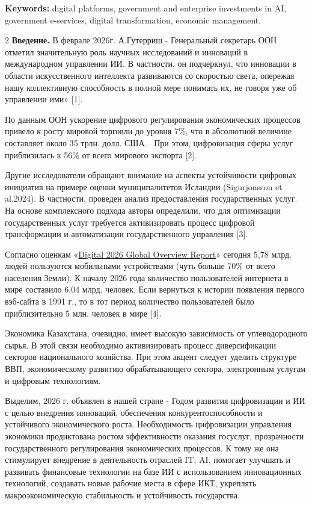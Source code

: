 {\bfseries Keywords:} digital platforms, government and enterprise
investments in AI, government e-services, digital transformation,
economic management.

\begin{multicols}{2}
{\bfseries Введение.} В феврале 2026г. А.Гутерриш - Генеральный секретарь
ООН отметил значительную роль научных исследований и инноваций в
международном управлении ИИ\emph{.} В частности, он подчеркнул, что
инновации в области искусственного интеллекта развиваются со скоростью
света, опережая нашу коллективную способность в полной мере понимать их,
не говоря уже об управлении ими» {[}1{]}.

По данным ООН ускорение цифрового регулирования экономических процессов
привело к росту мировой торговли до уровня 7\%, что в абсолютной
величине составляет около 35 трлн. долл. США.\emph{~} При этом,
цифровизация сферы услуг приблизилась к 56\% от всего мирового экспорта
{[}2{]}.

Другие исследователи обращают внимание на аспекты устойчивости цифровых
инициатив на примере оценки муниципалитетов Исландии (Sigurjonsson et
al.2024). В частности, проведен анализ предоставления государственных
услуг. На основе комплексного подхода авторы определили, что для
оптимизации государственных услуг требуется активизировать процесс
цифровой трансформации и автоматизации государственного управления
{[}3{]}.

Согласно оценкам
«\href{https://datareportal.com/reports/digital-2026-global-overview-report}{Digital
2026 Global Overview Report}» сегодня 5,78 млрд. людей пользуются
мобильными устройствами (чуть больше 70\% от всего населения Земли). К
началу 2026 года количество пользователей интернета в мире составило
6,04 млрд. человек. Если вернуться к истории появления первого вэб-сайта
в 1991 г., то в тот период количество пользователей было приблизительно
5 млн. человек в мире {[}4{]}.

Экономика Казахстана, очевидно, имеет высокую зависимость от
углеводородного сырья. В этой связи необходимо активизировать процесс
диверсификации секторов национального хозяйства. При этом акцент следует
уделить структуре ВВП, экономическому развитию обрабатывающего сектора,
электронным услугам и цифровым технологиям.

Выделим, 2026 г. объявлен в нашей стране - Годом развития цифровизации и
ИИ с целью внедрения инноваций, обеспечения конкурентоспособности и
устойчивого экономического роста. Необходимость цифровизации управления
экономики продиктована ростом эффективности оказания госуслуг,
прозрачности государственного регулирования экономических процессов. К
тому же она стимулирует внедрение в деятельность отраслей IT, AI,
помогает улучшать и развивать финансовые технологии на базе ИИ с
использованием инновационных технологий, создавать новые рабочие места в
сфере ИКТ, укреплять макроэкономическую стабильность и устойчивость
государства.


\end{multicols}
